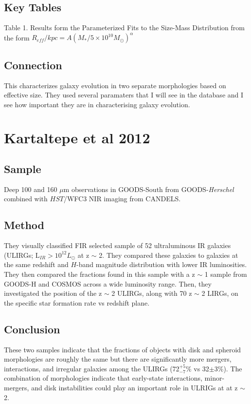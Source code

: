 \documentclass{article}
\begin{document}
\subsection{Key Tables}
Table 1. Results form the Parameterized Fits to the Size-Mass Distribution from the form 
$R_{eff}/kpc = A(M_{*}/5 \times 10^{10} M_{\odot})^{\alpha}$

\subsection{Connection}
This characterizes galaxy evolution in two separate morphologies based on effective size. They used several paramaters that I will see in the database and I see how important they are in characterising galaxy evolution.

\section{Kartaltepe et al 2012}
\subsection{Sample}
Deep 100 and 160 $\mu$m observations in GOODS-South from GOODS-\textit{Herschel} combined with $HST$/WFC3 NIR imaging from CANDELS.

\subsection{Method}
They visually classified FIR selected sample of 52 ultraluminous IR galaxies (ULIRGs; L$_{IR} > 10^{12} L_{\odot}$ at z $\sim$ 2. They compared these galaxies to galaxies at the same redshift and $H$-band magnitude distribution with lower IR luminosities. They then compared the fractions found in this sample with a z $\sim$ 1 sample from GOODS-H and COSMOS across a wide luminosity range. Then, they investigated the position of the z $\sim$ 2 ULIRGs, along with 70 z $\sim$ 2 LIRGs, on the specific star formation rate vs redshift plane.

\subsection{Conclusion}
These two samples indicate that the fractions of objects with disk and spheroid morphologies are roughly the same but there are significantly more mergers, interactions, and irregular galaxies among the ULIRGs (72$_{-7}^{+5}\%$ vs 32$\pm 3\% $). The combination of morphologies indicate that early-state interactions, minor-mergers, and disk instabilities could play an important role in ULRIGs at at z $\sim$ 2. 
\end{document}
